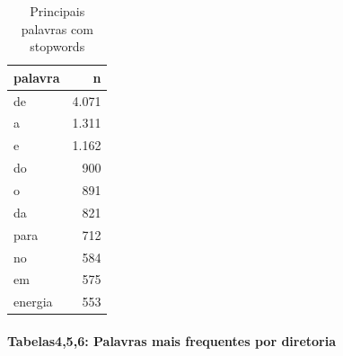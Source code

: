 \documentclass[]{article}
\newenvironment{Shaded}{\begin{snugshade}}{\end{snugshade}}
\newcommand{\DataTypeTok}[1]{\textcolor[rgb]{0.13,0.29,0.53}{#1}}
\newcommand{\DecValTok}[1]{\textcolor[rgb]{0.00,0.00,0.81}{#1}}
\newcommand{\KeywordTok}[1]{\textcolor[rgb]{0.13,0.29,0.53}{\textbf{#1}}}
\newcommand{\NormalTok}[1]{#1}
\newcommand{\OperatorTok}[1]{\textcolor[rgb]{0.81,0.36,0.00}{\textbf{#1}}}
\newcommand{\OtherTok}[1]{\textcolor[rgb]{0.56,0.35,0.01}{#1}}
\newcommand{\StringTok}[1]{\textcolor[rgb]{0.31,0.60,0.02}{#1}}
\let\oldparagraph\paragraph
\renewcommand{\paragraph}[1]{\oldparagraph{#1}\mbox{}}
\begin{document}
\begin{Shaded}
\end{Shaded}

\begin{table}[!h]

\caption{\label{tab:unnamed-chunk-30}Principais palavras com stopwords}
\centering
\begin{tabular}{lr}
\toprule
palavra & n\\
\midrule
\rowcolor{gray!6}  de & 4.071\\
a & 1.311\\
\rowcolor{gray!6}  e & 1.162\\
do & 900\\
\rowcolor{gray!6}  o & 891\\
\addlinespace
da & 821\\
\rowcolor{gray!6}  para & 712\\
no & 584\\
\rowcolor{gray!6}  em & 575\\
energia & 553\\
\bottomrule
\end{tabular}
\end{table}

\hypertarget{tabelas456-palavras-mais-frequentes-por-diretoria}{%
\paragraph{Tabelas4,5,6: Palavras mais frequentes por
diretoria}\label{tabelas456-palavras-mais-frequentes-por-diretoria}}
\end{document}
